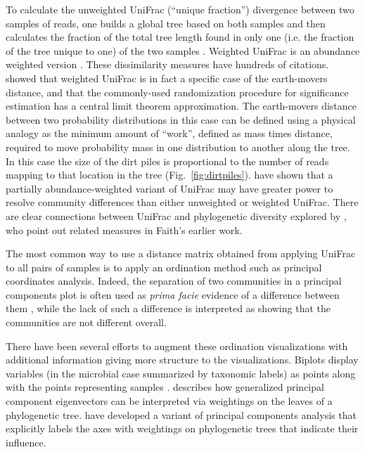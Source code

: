 \documentclass{amsart}
\begin{document}
To calculate the unweighted UniFrac (``unique fraction'') divergence between two samples of reads, one builds a global tree based on both samples and then calculates the fraction of the total tree length found in only one (i.e. the fraction of the tree unique to one) of the two samples \citep[Fig.~\ref{fig:unifrac};][]{LozuponeKnightUniFrac05}.
Weighted UniFrac is an abundance weighted version \citep{LozuponeEaWeightedUnifrac07}.
These dissimilarity measures have hundreds of citations.
\citet{evans2012phylogenetic} showed that weighted UniFrac is in fact a specific case of the earth-movers distance, and that the commonly-used randomization procedure for significance estimation has a central limit theorem approximation.
The earth-movers distance \citep{monge1781memoire,Villani2003-wv} between two probability distributions in this case can be defined using a physical analogy as the minimum amount of ``work'', defined as mass times distance, required to move probability mass in one distribution to another along the tree.
In this case the size of the dirt piles is proportional to the number of reads mapping to that location in the tree (Fig.~\ref{fig:dirtpiles}).
\citet{chen2012associating} have shown that a partially abundance-weighted variant of UniFrac may have greater power to resolve community differences than either unweighted or weighted UniFrac.
There are clear connections between UniFrac and phylogenetic diversity explored by \citet{faith2009cladistic}, who point out related measures in Faith's earlier work.

The most common way to use a distance matrix obtained from applying UniFrac to all pairs of samples is to apply an ordination method such as principal coordinates analysis.
Indeed, the separation of two communities in a principal components plot is often used as \emph{prima facie} evidence of a difference between them
\citep[e.g.][]{lozupone2007global,costello2009bacterial,yatsunenko2012human}, while the lack of such a difference is interpreted as showing that the communities are not different overall.

There have been several efforts to augment these ordination visualizations with additional information giving more structure to the visualizations.
Biplots display variables (in the microbial case summarized by taxonomic labels) as points along with the points representing samples \citep[e.g.][]{hewitt2013bacterial,lozupone2013meta}.
\citet{PurdomAnalyzingDataGraphs08} describes how generalized principal component eigenvectors can be interpreted via weightings on the leaves of a phylogenetic tree.
\citet{matsen2013edge} have developed a variant of principal components analysis that explicitly labels the axes with weightings on phylogenetic trees that indicate their influence.
\end{document}
